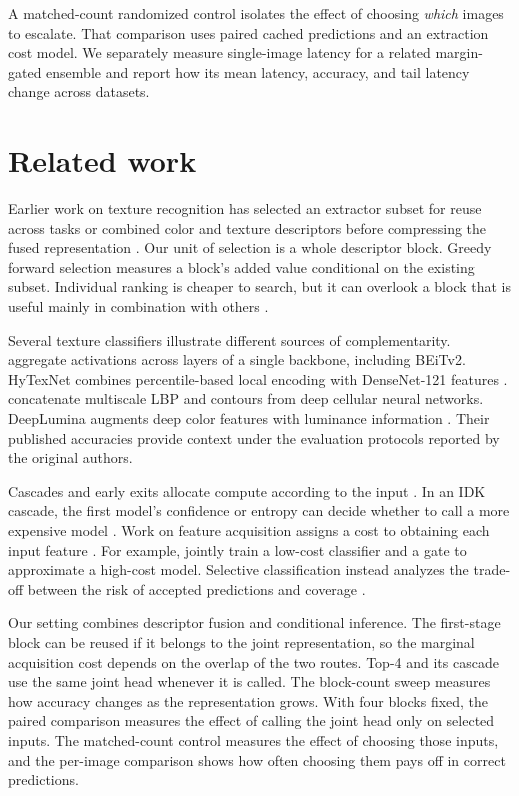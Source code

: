 \documentclass[10pt,a4paper,fleqn]{article}
\begin{document}
A matched-count randomized control isolates the effect of choosing \emph{which} images to escalate. That comparison uses paired cached predictions and an extraction cost model. We separately measure single-image latency for a related margin-gated ensemble and report how its mean latency, accuracy, and tail latency change across datasets.

\section{Related work}

Earlier work on texture recognition has selected an extractor subset for reuse across tasks \citep{puig2010selection} or combined color and texture descriptors before compressing the fused representation \citep{khan2015compact}. Our unit of selection is a whole descriptor block. Greedy forward selection measures a block's added value conditional on the existing subset. Individual ranking is cheaper to search, but it can overlook a block that is useful mainly in combination with others \citep{kohavi1997wrappers,guyon2003feature}.

Several texture classifiers illustrate different sources of complementarity. \citet{neshov2025aggregation} aggregate activations across layers of a single backbone, including BEiTv2. HyTexNet combines percentile-based local encoding with DenseNet-121 features \citep{gupta2026hytexnet}. \citet{chang2024cellnn} concatenate multiscale LBP and contours from deep cellular neural networks. DeepLumina augments deep color features with luminance information \citep{simon2022deeplumina}. Their published accuracies provide context under the evaluation protocols reported by the original authors.

Cascades and early exits allocate compute according to the input \citep{viola2001rapid,teerapittayanon2016branchynet,han2021dynamic}. In an IDK cascade, the first model's confidence or entropy can decide whether to call a more expensive model \citep{wang2018idk}. Work on feature acquisition assigns a cost to obtaining each input feature \citep{xu2012greedy,ma2019eddi}. For example, \citet{nan2017adaptive} jointly train a low-cost classifier and a gate to approximate a high-cost model. Selective classification instead analyzes the trade-off between the risk of accepted predictions and coverage \citep{geifman2017selective}.

Our setting combines descriptor fusion and conditional inference. The first-stage block can be reused if it belongs to the joint representation, so the marginal acquisition cost depends on the overlap of the two routes. Top-4 and its cascade use the same joint head whenever it is called. The block-count sweep measures how accuracy changes as the representation grows. With four blocks fixed, the paired comparison measures the effect of calling the joint head only on selected inputs. The matched-count control measures the effect of choosing those inputs, and the per-image comparison shows how often choosing them pays off in correct predictions.
\end{document}
